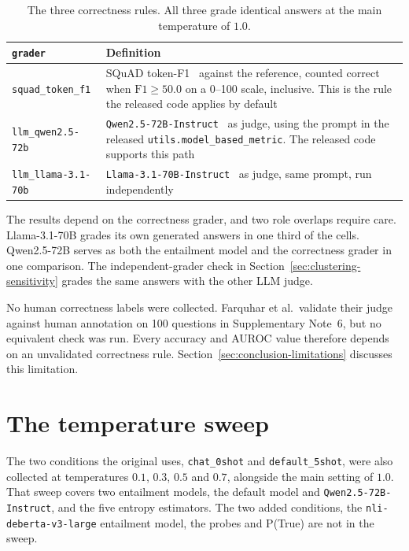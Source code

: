 \begin{table}[htb]
\centering
\small
\caption{The three correctness rules. All three grade identical answers at
  the main temperature of $1.0$.}
\label{tab:graders}
\begingroup
\setlength{\tabcolsep}{4pt}
\begin{tabular}{@{}>{\raggedright\arraybackslash}p{2.6cm}>{\raggedright\arraybackslash}p{7.6cm}@{}}
\toprule
\texttt{grader} & Definition \\
\midrule
\texttt{squad\_token\_f1} & SQuAD token-F1~\cite{rajpurkar_squad_2016} against
  the reference, counted correct when $\mathrm{F1} \ge 50.0$ on a 0--100
  scale, inclusive. This is the rule the released code applies by default \\
\addlinespace[2pt]
\texttt{llm\_qwen2.5-72b} & \texttt{Qwen2.5-72B-Instruct}~\cite{yang_qwen25_2024}
  as judge, using the prompt in the released \texttt{utils.model\_based\_metric}.
  The released code supports this path \\
\addlinespace[2pt]
\texttt{llm\_llama-3.1-70b} & \texttt{Llama-3.1-70B-Instruct}~\cite{grattafiori_llama3_2024}
  as judge, same prompt, run independently \\
\bottomrule
\end{tabular}
\endgroup
\end{table}

The results depend on the correctness grader, and two role overlaps require
care. Llama-3.1-70B grades its own generated answers in one third of the cells.
Qwen2.5-72B serves as both the entailment model and the correctness grader in
one comparison. The independent-grader check in
Section~\ref{sec:clustering-sensitivity} grades the same answers with the other
LLM judge.

No human correctness labels were collected. Farquhar et al.\ validate their
judge against human annotation on 100 questions in Supplementary Note~6, but
no equivalent check was run. Every accuracy and AUROC value
therefore depends on an unvalidated correctness rule.
Section~\ref{sec:conclusion-limitations} discusses this limitation.

\section{The temperature sweep}
\label{sec:temperature-sweep}

The two conditions the original uses, \texttt{chat\_0shot} and
\texttt{default\_5shot}, were also collected at temperatures $0.1$, $0.3$,
$0.5$ and $0.7$, alongside the main setting of $1.0$. That sweep covers two
entailment models, the default model and \texttt{Qwen2.5-72B-Instruct}, and the
five entropy estimators. The two added conditions, the
\texttt{nli-deberta-v3-large} entailment model, the probes and P(True) are not
in the sweep.


